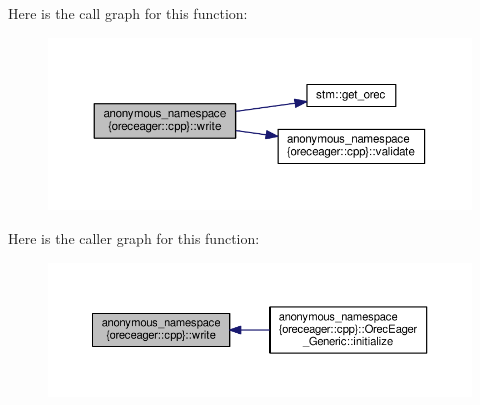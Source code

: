 Here is the call graph for this function\-:
\nopagebreak
\begin{figure}[H]
\begin{center}
\leavevmode
\includegraphics[width=350pt]{namespaceanonymous__namespace_02oreceager_8cpp_03_a4412d636846d1de7149b2ef022d5bf83_cgraph}
\end{center}
\end{figure}




Here is the caller graph for this function\-:
\nopagebreak
\begin{figure}[H]
\begin{center}
\leavevmode
\includegraphics[width=350pt]{namespaceanonymous__namespace_02oreceager_8cpp_03_a4412d636846d1de7149b2ef022d5bf83_icgraph}
\end{center}
\end{figure}


